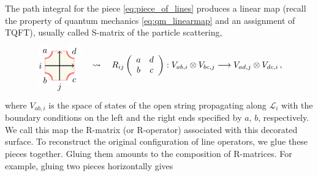 The path integral for the piece \eqref{eq:piece_of_lines} produces a linear map
(recall the property of quantum mechanics \eqref{eq:qm_linearmap} and
an assignment of TQFT), usually called S-matrix of the particle scattering,
\begin{equation}
    \begin{tikzpicture}[scale=0.6, baseline=(x.base)]
        \node (x) at (0,0) {\vphantom{x}};

        \draw[color=red!50, fill=olive!5] (-1,-1) rectangle (1,1);

        \fill[color=white] (-1,1) circle (0.5);  \node (a) at (-1,1) {$a$};
        \draw[draw=red, double]  (-1,0.5) arc (-90:0:0.5);
        \fill[color=white] (-1,-1) circle (0.5);  \node (b) at (-1,-1) {$b$};
        \draw[draw=red, double]  (-1,-0.5) arc (90:0:0.5);
        \fill[color=white] (1,-1) circle (0.5);  \node (c) at (1,-1) {$c$};
        \draw[draw=red, double]  (1,-0.5) arc (90:180:0.5);
        \fill[color=white] (1,1) circle (0.5);  \node (d) at (1,1) {$d$};
        \draw[draw=red, double]  (1,0.5) arc (-90:-180:0.5);

        \draw[thick, ->] (-1,0) node[left] {$i$} -- (1,0);
        \draw[thick, ->] (0,-1) node[below] {$j$} -- (0,1);

    \end{tikzpicture}
  \quad \rightsquigarrow \quad
R_{ij}\left(%
  \begin{array}{cc}
        a & d\\
        b & c
  \end{array}%
\right)
  :  V_{ab,i}\otimes V_{bc,j}  \longrightarrow  V_{ad,j}\otimes V_{dc,i} \, ,
\end{equation}
where $V_{ab,i}$ is the space of states of the open string propagating
along $\mathcal{L}_{i}$ with the boundary conditions on the left
and the right ends specified by $a,\,b$, respectively. We call this
map the R-matrix (or R-operator) associated with this decorated surface.
To reconstruct the original configuration of line operators, we glue these
pieces together. Gluing them amounts to the composition of R-matrices.
For example, gluing two pieces horizontally gives
